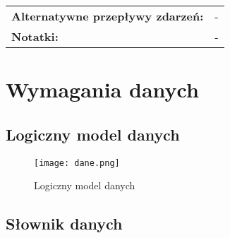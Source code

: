\documentclass[a4paper,20pt]{article}
\begin{document}
\begin{center}
\begin{tabularx}{\textwidth}[t]{XX}
\quad \textbf{Alternatywne przepływy zdarzeń:} & 
\begin{minipage}[t]{\linewidth}%
-
\end{minipage}\\


\quad \textbf{Notatki:} & 
\begin{minipage}[t]{\linewidth}%
-
\end{minipage}\\


\end{tabularx}
\end{center}


\newpage
\section{Wymagania danych}

\subsection{Logiczny model danych}



\begin{figure}[H]
\centerline{\texttt{[image: dane.png]}}
\caption{Logiczny model danych}
\label{dane}
\end{figure}


\newpage
\subsection{Słownik danych}
\end{document}
